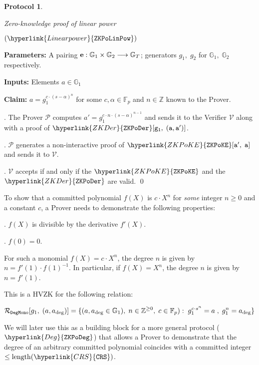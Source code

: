 \documentclass[11pt, lettersize, notitlepage, leqno, footskip=0.6cm]{article}
\newcommand{\bz}{\mathbb Z}
\newcommand{\bFp}{\mathbb{F}_p}
\newcommand{\lra}{\longrightarrow}
\newcommand{\mc}{\mathcal}
\newcommand{\mb}{\mathbb}
\newcommand{\mr}{\mathrm}
\newcommand{\al}{\alpha}
\newcommand{\mP}{\mc{P}}
\newcommand{\V}{\mc{V}}
\newcommand{\vs}{\vspace{-0.15cm}}
\newcommand{\noin}{\noindent}
\newtheorem{Prot}[Thm]{Protocol}
\numberwithin{equation}{section}
\begin{document}
\begin{mdframed}
\begin{Prot} \hypertarget{LinPow}{Zero-knowledge proof of linear power} $(\hyperlink{Linear power}{\tt{ZKPoLinPow}})$\end{Prot}  

\noin \textbf{Parameters:} A pairing ${\bf{e}}:\mb{G}_1\times \mb{G}_2\lra \mb{G}_T$; generators $g_1,\;g_2$ for $\mb{G}_1,\; \mb{G}_2$ respectively.


\noindent \textbf{Inputs:} Elements $a\in \mb{G}_1$

\noindent \textbf{Claim:} $a = g_1^{c\cdot (s-\al)^n}$ for some $c,\al\in \bFp$ and $n\in \bz$ known to the Prover. \vspace{2mm}

. The Prover $\mP$ computes $a' = g_1^{c\cdot n\cdot (s-\al)^{n-1}}$ and sends it to the Verifier $\V$ along with a proof of $\hyperlink{ZKDer}{\tt{ZKPoDer}}[g_1,\;(a,a')]$.

\noin 2. $\mP$ generates a non-interactive proof of $\hyperlink{ZKPoKE}{\tt{ZKPoKE}}[a',\;a]$ and sends it to $\V$.

\noin 3. $\V$ accepts if and only if the $\hyperlink{ZKPoKE}{\tt{ZKPoKE}}$ and the $\hyperlink{ZKDer}{\tt{ZKPoDer}}$ are valid.  \qed 
\end{mdframed}

\bigskip

To show that a committed polynomial $f(X)$ is $c\cdot X^n$ for \textit{some} integer $n\geq 0$ and a constant $c$, a Prover needs to demonstrate the following properties: \vspace{2mm}

\noin 1. $f(X)$ is divisible by the derivative $f'(X)$. \vspace{1mm}

\noin 2. $f(0) = 0$. \vspace{1mm}

For such a monomial $f(X) = c\cdot X^n$, the degree $n$ is given by $n = f'(1)\cdot f(1)^{-1}$. In particular, if  $f(X) = X^n$, the degree $n$ is given by $n = f'(1)$.   

This is a HVZK for the following relation:

\vs $$\mc{R}_{\tt{DegMono}}[g_1,\;(a, a_{\deg})] = \{
(a,a_{\deg} \in \mb{G}_1),\; n\in \bz^{\geq 0},\;c\in\bFp):\; g_1^{c\cdot s^n} = a\;,\; g_1^{n} = a_{\deg} \}  $$


We will later use this as a building block for a more general protocol ($\hyperlink{Deg}{\tt{ZKPoDeg}}$) that allows a Prover to demonstrate that the degree of an arbitrary committed polynomial coincides with a committed integer $\leq \mr{length}({\hyperlink{CRS}{\tt{CRS}}})$.
\end{document}
